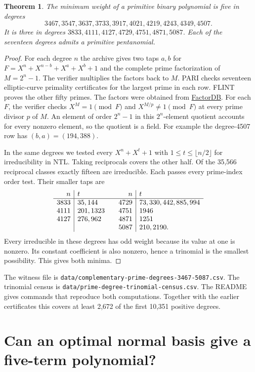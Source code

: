 \documentclass[11pt]{article}
\newtheorem{theorem}{Theorem}
\begin{document}
\begin{theorem}
The minimum weight of a primitive binary polynomial is five in degrees
\[
  3467,3547,3637,3733,3917,4021,4219,4243,4349,4507.
\]
It is three in degrees \(3833,4111,4127,4729,4751,4871,5087\).
Each of the seventeen degrees admits a primitive pentanomial.
\end{theorem}
\begin{proof}
For each degree \(n\) the archive gives two taps \(a,b\) for
\(F=X^n+X^{n-b}+X^a+X^b+1\) and the complete prime factorization
of \(M=2^n-1\). The verifier multiplies the factors back to \(M\).
PARI checks seventeen elliptic-curve primality certificates for the
largest prime in each row. FLINT proves the other fifty primes.
The factors were obtained from \href{https://factordb.com/}{FactorDB}.
For each \(F\), the verifier checks \(X^M=1\pmod F\) and
\(X^{M/p}\ne1\pmod F\) at every prime divisor \(p\) of \(M\).
An element of order \(2^n-1\) in this \(2^n\)-element quotient
accounts for every nonzero element, so the quotient is a field.
For example the degree-4507 row has \((b,a)=(194,388)\).

In the same degrees we tested every \(X^n+X^t+1\) with
\(1\le t\le\lfloor n/2\rfloor\) for irreducibility in NTL. Taking
reciprocals covers the other half. Of the 35,566 reciprocal classes
exactly fifteen are irreducible. Each passes every prime-index order test.
Their smaller taps are
\[
\begin{array}{r|l@{\qquad}r|l}
n & t & n & t\\ \hline
3833 & 35,144 & 4729 & 73,330,442,885,994\\
4111 & 201,1323 & 4751 & 1946\\
4127 & 276,962 & 4871 & 1251\\
     &         & 5087 & 210,2190 .
\end{array}
\]
Every irreducible in these degrees has odd weight because its value
at one is nonzero. Its constant coefficient is also nonzero, hence
a trinomial is the smallest possibility. This gives both minima.
\end{proof}

The witness file is \nolinkurl{data/complementary-prime-degrees-3467-5087.csv}.
The trinomial census is \nolinkurl{data/prime-degree-trinomial-census.csv}.
The README gives commands that reproduce both computations.
Together with the earlier certificates this covers at least 2,672
of the first 10,351 positive degrees.

\clearpage
\section{Can an optimal normal basis give a five-term polynomial?}
\label{sec:optimal-normal-weights}
\end{document}
